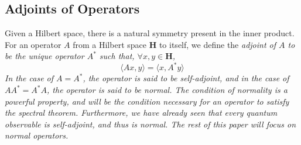 \subsection{Adjoints of Operators}
Given a Hilbert space, there is a natural symmetry present in the inner product.
For an operator $A$ from a Hilbert space \textbf{H} to itself, we define the
\em adjoint of $A$ \em to be the unique operator $A^*$ such that, $\forall x,y
\in \textbf{H}$,
\[
    \langle Ax,y\rangle = \langle x, A^*y\rangle
\]
In the case of $A=A^*$, the operator is said to be \em self-adjoint\em, and in
the case of $AA^*=A^*A$, the operator is said to be \em normal\em. The condition
of normality is a powerful property, and will be the condition necessary for an
operator to satisfy the spectral theorem. Furthermore, we have already seen that
every quantum observable is self-adjoint, and thus is normal. The rest of this
paper will focus on normal operators.
